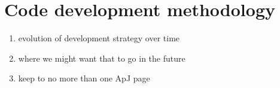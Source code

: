 
\section{Code development methodology}

\begin{enumerate}
\item evolution of development strategy over time
\item where we might want that to go in the future
\item keep to no more than one ApJ page
\end{enumerate}

